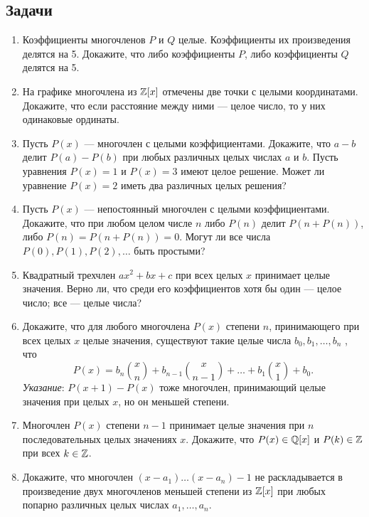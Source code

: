 \subsection*{Задачи}

\begin{enumerate}
\item Коэффициенты многочленов $P$ и $Q$ целые. Коэффициенты их произведения делятся на 5.
Докажите, что либо коэффициенты $P$, либо коэффициенты $Q$ делятся на 5.
\item На графике многочлена из $\mathbb Z[x]$ отмечены две точки с целыми координатами. Докажите, что
если расстояние между ними --- целое число, то у них одинаковые ординаты.
\item Пусть $P(x)$ --- многочлен с целыми коэффициентами.
\ipunkt Докажите, что $a - b$ делит $P(a) - P(b)$ при любых различных целых числах $a$ и $b$.
\ipunkt Пусть уравнения $P(x) = 1$ и $P(x) = 3$ имеют целое решение. Может ли уравнение $P(x) = 2$ иметь
два различных целых решения?
\item Пусть $P(x)$ --- непостоянный многочлен с целыми коэффициентами.
\ipunkt Докажите, что при любом целом числе $n$ либо $P(n)$ делит $P(n + P(n))$, либо $P(n) = P(n + P(n)) = 0$.
\ipunkt Могут ли все числа $P(0), P(1), P(2), \dots$ быть простыми?
\item Квадратный трехчлен $ax^2 + bx + c$ при всех целых $x$ принимает целые значения. Верно ли,
что среди его коэффициентов \ipunkt хотя бы один --- целое число; \ipunkt все --- целые числа?
\item Докажите, что для любого многочлена $P(x)$ степени $n$, принимающего при всех целых $x$
целые значения, существуют такие целые числа $b_0, b_1, \dots, b_n$ , что
$$
P(x) = b_n \binom xn + b_{n-1} \binom x{n-1} + \dots + b_1\binom x1 + b_0.
$$
\textit{Указание}: $P(x+1)-P(x)$ тоже многочлен, принимающий целые значения при целых $x$, но он меньшей степени.
\item Многочлен $P(x)$ степени $n - 1$ принимает целые значения при $n$ последовательных целых
значениях $x$. Докажите, что $P(x) \in \mathbb Q[x]$ и $P(k) \in \mathbb Z$ при всех $k \in \mathbb Z$.
\item Докажите, что многочлен $(x - a_1) \dots (x - a_n) - 1$ не раскладывается в произведение двух
многочленов меньшей степени из $\mathbb Z[x]$ при любых попарно различных целых числах $a_1, \dots, a_n$.

\end{enumerate}












